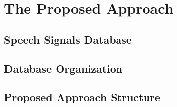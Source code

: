 \section{The Proposed Approach}
	\label{sec:propApproach}
	\subsection{Speech Signals Database}
	\subsection{Database Organization}
	\subsection{Proposed Approach Structure}
